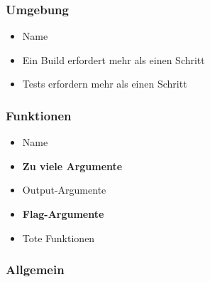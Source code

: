 \subsubsection{Umgebung}
\begin{itemize}
	\item Name
	\item Ein Build erfordert mehr als einen Schritt 
	\item Tests erfordern mehr als einen Schritt 
\end{itemize}

\subsubsection{Funktionen}

\begin{itemize}
	\item Name 
	\item \textbf{Zu viele Argumente}
	\item Output-Argumente 
	\item \textbf{Flag-Argumente}
	\item Tote Funktionen 
\end{itemize}

\subsubsection{Allgemein}

